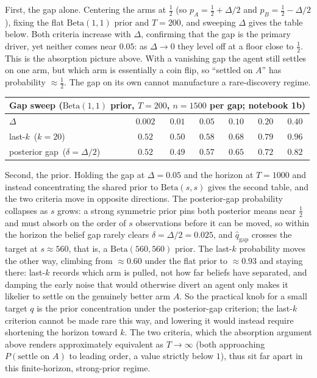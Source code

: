 \documentclass[12pt]{article}
\begin{document}
First, the gap alone. Centering the arms at $\tfrac12$ (so $p_A = \tfrac12 + \Delta/2$ and $p_B = \tfrac12 - \Delta/2$), fixing the flat $\mathrm{Beta}(1,1)$ prior and $T = 200$, and sweeping $\Delta$ gives the table below. Both criteria increase with $\Delta$, confirming that the gap is the primary driver, yet neither comes near $0.05$: as $\Delta \to 0$ they level off at a floor close to $\tfrac12$. This is the absorption picture above. With a vanishing gap the agent still settles on one arm, but which arm is essentially a coin flip, so ``settled on $A$'' has probability $\approx \tfrac12$. The gap on its own cannot manufacture a rare-discovery regime.

\begin{center}
\small
\begin{tabular}{lcccccc}
\toprule
\multicolumn{7}{c}{\textbf{Gap sweep} \quad ($\mathrm{Beta}(1,1)$ prior, $T = 200$, $n = 1500$ per gap; notebook 1b)}\\
\midrule
$\Delta$ & $0.002$ & $0.01$ & $0.05$ & $0.10$ & $0.20$ & $0.40$\\
\midrule
last-$k$ \,($k = 20$) & $0.52$ & $0.50$ & $0.58$ & $0.68$ & $0.79$ & $0.96$\\
posterior gap \,($\delta = \Delta/2$) & $0.52$ & $0.49$ & $0.57$ & $0.65$ & $0.72$ & $0.82$\\
\bottomrule
\end{tabular}
\end{center}

Second, the prior. Holding the gap at $\Delta = 0.05$ and the horizon at $T = 1000$ and instead concentrating the shared prior to $\mathrm{Beta}(s,s)$ gives the second table, and the two criteria move in opposite directions. The posterior-gap probability collapses as $s$ grows: a strong symmetric prior pins both posterior means near $\tfrac12$ and must absorb on the order of $s$ observations before it can be moved, so within the horizon the belief gap rarely clears $\delta = \Delta/2 = 0.025$, and $\hat q_{\text{gap}}$ crosses the target at $s \approx 560$, that is, a $\mathrm{Beta}(560,560)$ prior. The last-$k$ probability moves the other way, climbing from $\approx 0.60$ under the flat prior to $\approx 0.93$ and staying there: last-$k$ records which arm is pulled, not how far beliefs have separated, and damping the early noise that would otherwise divert an agent only makes it likelier to settle on the genuinely better arm $A$. So the practical knob for a small target $q$ is the prior concentration under the posterior-gap criterion; the last-$k$ criterion cannot be made rare this way, and lowering it would instead require shortening the horizon toward $k$. The two criteria, which the absorption argument above renders approximately equivalent as $T \to \infty$ (both approaching $P(\text{settle on } A)$ to leading order, a value strictly below $1$), thus sit far apart in this finite-horizon, strong-prior regime.
\end{document}
